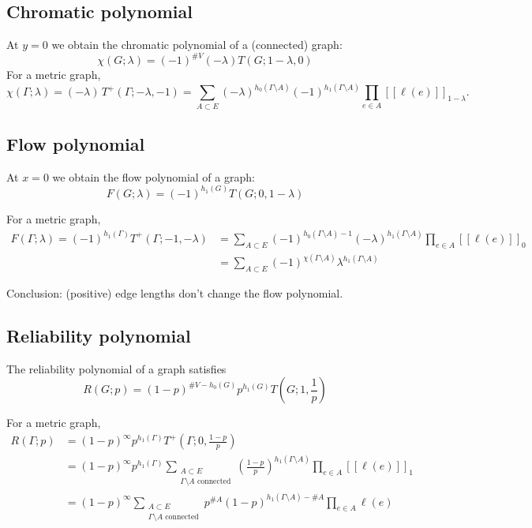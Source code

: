 \documentclass{amsart}
\theoremstyle{definition}
\newcommand{\fanalog}[2]{[\![#2]\!]_{#1}}
\begin{document}
\subsection{Chromatic polynomial}
At $y=0$ we obtain the chromatic polynomial of a (connected) graph:
\begin{equation*}
\chi(G; \lambda) = (-1)^{\#V } (-\lambda) T(G; 1-\lambda,0)
\end{equation*}
For a metric graph,
\begin{equation*}
	\chi(\Gamma; \lambda) = (-\lambda)\, T^+(\Gamma; -\lambda, -1) 
	= \sum_{A \subset E} (-\lambda)^{h_0(\Gamma \setminus A)} (-1)^{h_1(\Gamma \setminus A)} 
	\prod_{e \in A} \fanalog{1 - \lambda}{\ell(e)} .
\end{equation*}

\subsection{Flow polynomial}
At $x = 0$ we obtain the flow polynomial of a graph:
\begin{equation*}
F(G; \lambda) = (-1)^{h_1(G)} T(G; 0, 1 - \lambda)
\end{equation*}

For a metric graph,
\begin{align*}
	F(\Gamma; \lambda) = (-1)^{h_1(\Gamma)} T^+(\Gamma; -1, -\lambda) 
	&= \sum_{A \subset E} (-1)^{h_0(\Gamma \setminus A) - 1} (-\lambda)^{h_1(\Gamma \setminus A)} \prod_{e \in A} \fanalog{0}{\ell(e)} \\
	&= \sum_{A \subset E} (-1)^{\chi(\Gamma \setminus A)} \lambda^{h_1(\Gamma \setminus A)}
\end{align*}

Conclusion: (positive) edge lengths don't change the flow polynomial.

\subsection{Reliability polynomial}
The reliability polynomial of a graph satisfies
\begin{equation*}
R(G; p) = (1 - p)^{\# V - h_0(G)} p^{h_1(G)} T\left(G; 1, \frac{1}{p} \right)
\end{equation*}

For a metric graph,
\begin{align*}
R(\Gamma; p) &= (1 - p)^\infty p^{h_1(\Gamma)} T^+\left(\Gamma; 0, \frac{1 - p}{p} \right) \\
&= (1 - p)^\infty p^{h_1(\Gamma)} \sum_{\substack{A \subset E \\ \Gamma \setminus A \text{ connected}}} \left(\frac{1 - p}{p}\right)^{h_1(\Gamma \setminus A)} \prod_{e \in A} \fanalog{1}{\ell(e)} \\
&= (1 - p)^\infty \sum_{\substack{A \subset E \\ \Gamma \setminus A \text{ connected}}} p^{\# A} (1 - p)^{h_1(\Gamma \setminus A) - \# A} \prod_{e \in A} \ell(e) 
\end{align*}
\end{document}
